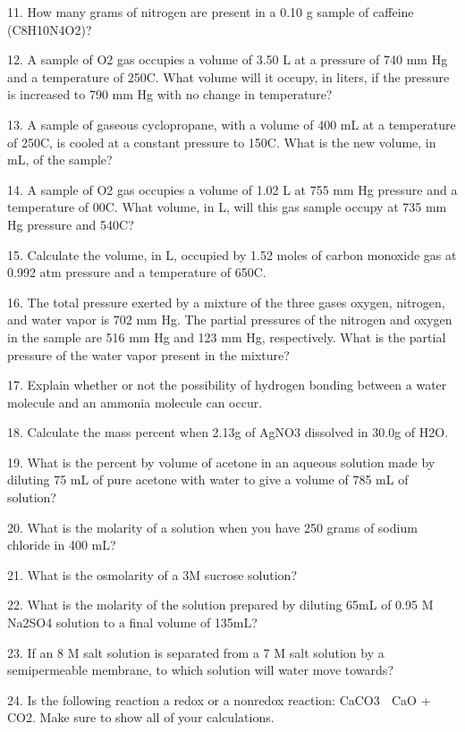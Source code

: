 \documentclass[addpoints, 12pt]{exam}
\begin{document}
\begin{questions}
11. How many grams of nitrogen are present in a 0.10 g sample of caffeine (C8H10N4O2)?


12. A sample of O2 gas occupies a volume of 3.50 L at a pressure of 740 mm Hg and a temperature of 250C.  What volume will it occupy, in liters, if the pressure is increased to 790 mm Hg with no change in temperature?

13. A sample of gaseous cyclopropane, with a volume of 400 mL at a temperature of 250C, is cooled at a constant pressure to 150C.  What is the new volume, in mL, of the sample?



14. A sample of O2 gas occupies a volume of 1.02 L at 755 mm Hg pressure and a temperature of 00C.  What volume, in L, will this gas sample occupy at 735 mm Hg pressure and 540C?


15. Calculate the volume, in L, occupied by 1.52 moles of carbon monoxide gas at 0.992 atm pressure and a temperature of 650C.


16. The total pressure exerted by a mixture of the three gases oxygen, nitrogen, and water vapor is 702 mm Hg.  The partial pressures of the nitrogen and oxygen in the sample are 516 mm Hg and 123 mm Hg, respectively.  What is the partial pressure of the water vapor present in the mixture?



17. Explain whether or not the possibility of hydrogen bonding between a water molecule and an ammonia molecule can occur.


18. Calculate the mass percent when 2.13g of AgNO3 dissolved in 30.0g of H2O.


19. What is the percent by volume of acetone in an aqueous solution made by diluting 75 mL of pure acetone with water to give a volume of 785 mL of solution?  



20. What is the molarity of a solution when you have 250 grams of sodium chloride in 400 mL?



21. What is the osmolarity of a 3M sucrose solution?

22. What is the molarity of the solution prepared by diluting 65mL of 0.95 M Na2SO4 solution to a final volume of 135mL?


23. If an 8 M salt solution is separated from a 7 M salt solution by a semipermeable membrane, to which solution will water move towards?

24. Is the following reaction a redox or a nonredox reaction:  CaCO3  CaO + CO2.   Make sure to show all of your calculations.



\end{questions}
\end{document}
